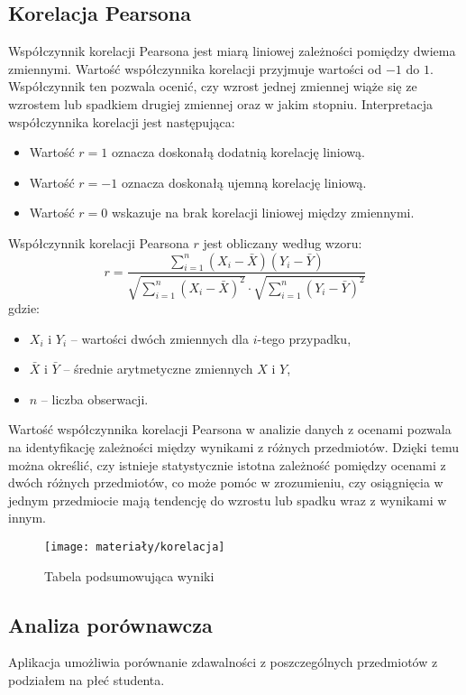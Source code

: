 \subsection{Korelacja Pearsona}
Współczynnik korelacji Pearsona jest miarą liniowej zależności pomiędzy dwiema zmiennymi. Wartość współczynnika korelacji przyjmuje wartości od \( -1 \) do \( 1 \). Współczynnik ten pozwala ocenić, czy wzrost jednej zmiennej wiąże się ze wzrostem lub spadkiem drugiej zmiennej oraz w jakim stopniu. Interpretacja współczynnika korelacji jest następująca:
\begin{itemize}
	\item Wartość \( r = 1 \) oznacza doskonałą dodatnią korelację liniową.
	\item Wartość \( r = -1 \) oznacza doskonałą ujemną korelację liniową.
	\item Wartość \( r = 0 \) wskazuje na brak korelacji liniowej między zmiennymi.
\end{itemize}

Współczynnik korelacji Pearsona \( r \) jest obliczany według wzoru:
\[
r = \frac{\sum_{i=1}^{n} (X_i - \bar{X})(Y_i - \bar{Y})}{\sqrt{\sum_{i=1}^{n} (X_i - \bar{X})^2} \cdot \sqrt{\sum_{i=1}^{n} (Y_i - \bar{Y})^2}}
\]
gdzie:
\begin{itemize}
	\item \( X_i \) i \( Y_i \) – wartości dwóch zmiennych dla \( i \)-tego przypadku,
	\item \( \bar{X} \) i \( \bar{Y} \) – średnie arytmetyczne zmiennych \( X \) i \( Y \),
	\item \( n \) – liczba obserwacji.
\end{itemize}

Wartość współczynnika korelacji Pearsona w analizie danych z ocenami pozwala na identyfikację zależności między wynikami z różnych przedmiotów. Dzięki temu można określić, czy istnieje statystycznie istotna zależność pomiędzy ocenami z dwóch różnych przedmiotów, co może pomóc w zrozumieniu, czy osiągnięcia w jednym przedmiocie mają tendencję do wzrostu lub spadku wraz z wynikami w innym.

\begin{figure}[ht]
	\centering
	\texttt{[image: materiały/korelacja]}
	\caption{Tabela podsumowująca wyniki}
\end{figure}

\subsection{Analiza porównawcza}
Aplikacja umożliwia porównanie zdawalności z poszczególnych przedmiotów z podziałem na płeć studenta.

